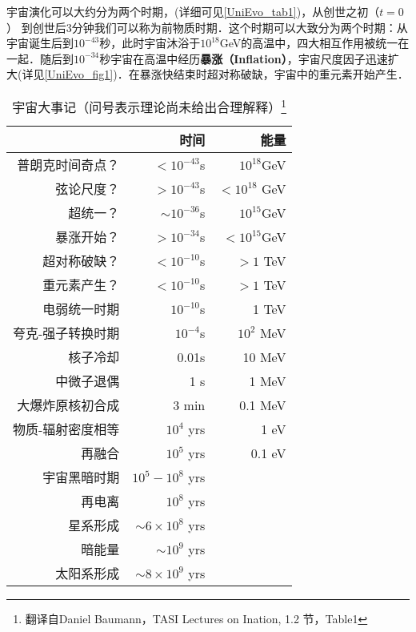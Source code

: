 
宇宙演化可以大约分为两个时期，(详细可见\autoref{UniEvo_tab1})，从创世之初（$t=0$） 到创世后3分钟我们可以称为前物质时期．这个时期可以大致分为两个时期：从宇宙诞生后到$10^{-43}$秒，此时宇宙沐浴于$10^{18}$GeV的高温中，四大相互作用被统一在一起．随后到$10^{-34}$秒宇宙在高温中经历\textbf{暴涨（Inflation）}，宇宙尺度因子迅速扩大(详见\autoref{UniEvo_fig1})．在暴涨快结束时超对称破缺，宇宙中的重元素开始产生．

\begin{table}[ht]
\centering
\caption{宇宙大事记（问号表示理论尚未给出合理解释）\footnote{翻译自Daniel Baumann，TASI Lectures on Ination, 1.2 节，Table1}}\label{UniEvo_tab1}
\begin{tabular}{|r|r|r|}
\hline
 & 时间 & 能量 \\
\hline
普朗克时间奇点？ & $<10^{-43}$s & $10^{18}$GeV \\
\hline
弦论尺度？       & $>10^{-43}$s & $<10^{18}$ GeV \\
\hline
超统一？         & $\sim 10^{-36}$s & $10^{15}$GeV \\
\hline
暴涨开始？       & $>10^{-34}$s & $<10^{15} $GeV \\
\hline
超对称破缺？     & $<10^{-10}$s & $>1$ TeV \\
\hline
重元素产生？     & $<10^{-10}$s & $>1$ TeV \\
\hline
电弱统一时期    & $10^{-10}$s & 1 TeV \\
\hline
夸克-强子转换时期 & $10^{-4}$s & $10^2$ MeV \\
\hline
核子冷却        & 0.01s & 10 MeV \\
\hline
中微子退偶      & 1 s  & 1 MeV \\
\hline
大爆炸原核初合成  & 3 min & 0.1 MeV \\
\hline
物质-辐射密度相等 & $10^4$ yrs  & 1 eV \\
\hline
再融合 & $10^5$ yrs  & 0.1 eV \\
\hline
宇宙黑暗时期 & $10^5 - 10^8$ yrs  &  \\
\hline
再电离 & $10^8$ yrs  &  \\
\hline
星系形成 & $\sim 6 \times 10^8$ yrs  &  \\
\hline
暗能量 & $\sim 10^9$  yrs  &  \\
\hline
太阳系形成 & $ \sim 8 \times 10^9  $ yrs  &  \\
\hline
\end{tabular}
\end{table}

